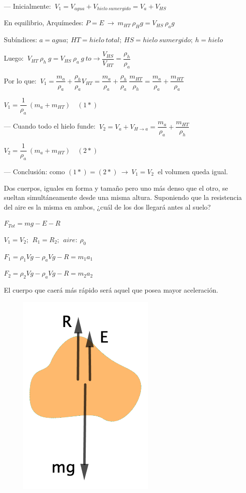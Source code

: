 --- Inicialmente: $\ V_1=V_{agua}+V_{hielo \ sumergido}=V_a+V_{HS}$

En equilibrio, Arquímedes:  $P=E \ \to \ m_{HT}\ \rho_H g=V_{HS} \ \rho_a g$

\textcolor{gris}{Subíndices: $a=agua;\ HT=hielo\ total;\ HS=hielo\ sumergido; \ h=hielo$}

Luego: $\ V_{HT} \ \rho_h \ g=V_{HS}\ \rho_a \ g \ to \to \dfrac{V_{HS}}{V_{HT}}=\dfrac{\rho_h}{\rho_a}$

Por lo que: $\ V_1=\dfrac {m_a}{\rho_a}+\dfrac{\rho_h}{\rho_a}V_{HT}= 
\dfrac {m_a}{\rho_a}+\dfrac{\rho_h}{\rho_a}\ \dfrac{m_{HT}}{\rho_h}=
\dfrac {m_a}{\rho_a}+\dfrac{m_{HT}}{\rho_a}$

$V_1=
\dfrac{1}{\rho_a}\ (m_a+m_{HT}) \quad (1*)$

--- Cuando todo el hielo funde: $\ V_2=V_a+V_{H\to a}=\dfrac{m_a}{\rho_a}+\dfrac{m_{HT}}{\rho_h}$

$V_2=
\dfrac{1}{\rho_a}\ (m_a+m_{HT}) \quad (2*)$

--- Conclusión: como $(1*)=(2*)\ \to \ V_1=V_2 \ $ el volumen queda igual.

\begin{prob}
Dos cuerpos, iguales en forma y tamaño pero uno más denso que el otro, se sueltan simultáneamente desde una misma altura. Suponiendo que la resistencia del aire es la misma en ambos, ¿cuál de los dos llegará antes al suelo?	
\end{prob}

\begin{multicols}{2}
$F_{Tot}=mg-E-R$

$V_1=V_2;\ \ R_1=R_2;\ \ aire:\ \rho_0$

$F_1=\rho_1Vg-\rho_aVg-R=m_1a_1$

$F_2=\rho_2Vg-\rho_aVg-R=m_2a_2$

El cuerpo que caerá más rápido será aquel que posea mayor aceleración.
\begin{figure}[H]
	\centering
	\includegraphics[width=.2\textwidth]{imagenes/imagenes07/T07IM22.png}
\end{figure}
\end{multicols}

